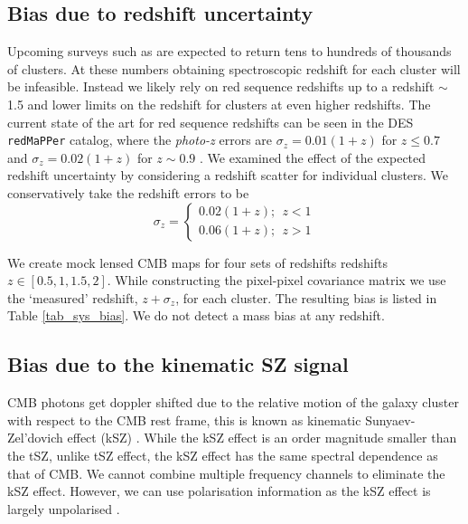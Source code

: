  \subsection{Bias due to redshift uncertainty}
Upcoming surveys such as \citep{benson14,so18, cmbs4-sb1} are expected to return tens to hundreds of thousands of clusters. 
 At these numbers obtaining spectroscopic redshift for each cluster will be infeasible.  
Instead we likely rely on red sequence redshifts up to a redshift $\sim$ 1.5 and lower limits on the redshift for clusters at even higher redshifts. 
The current state of the art for red sequence redshifts can be seen in the  DES \texttt{redMaPPer} catalog, where the \emph{photo-z} errors are $\sigma_{z} = 0.01 (1+z)$ for $z \le 0.7$ and $\sigma_{z} = 0.02 (1+z)$ for $z \sim 0.9$ \citep{rykoff16}. We examined the effect of the expected redshift uncertainty by considering a redshift scatter for individual clusters. We conservatively take the redshift errors to be
\begin{equation}\nonumber
\sigma_z = \left\{
\begin{array}{l}
    0.02 (1+z);  ~~z < 1 \\
    0.06 (1+z);  ~~z > 1
  \end{array}\right.
\end{equation}

We create mock lensed CMB maps for four sets of redshifts redshifts $z\in[0.5, 1, 1.5, 2]$. While constructing the pixel-pixel covariance matrix we use the `measured' redshift, $z + \sigma_{z}$, for each cluster.                                                                        
The resulting bias is listed in Table \ref{tab_sys_bias}. We do not detect a mass bias at any redshift. 
 
\subsection{Bias due to the kinematic SZ signal}
\label{sec_ksz_bias}
CMB photons get doppler shifted due to the relative motion of the galaxy cluster with respect to the CMB rest frame, this is known as kinematic Sunyaev-Zel'dovich effect (kSZ) \citep{sunyaev72}.
While the kSZ effect is an order magnitude smaller than the tSZ, unlike tSZ effect, the kSZ effect has the same spectral dependence as that of CMB. 
We cannot combine multiple frequency channels to eliminate the kSZ effect. 
However, we can use polarisation information as the kSZ effect is largely unpolarised  \citep{sazonov99}.

